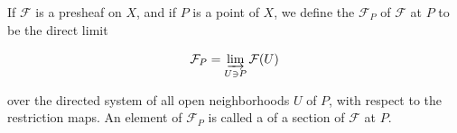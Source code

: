 If $\mathcal{F}$ is a presheaf on $X$, and if $P$ is a point of $X$, we define the  $\mathcal{F}_P$ of $\mathcal{F}$ at $P$ to be the direct limit

$$\mathcal{F}_P = \varinjlim_{U \ni P} \mathcal{F}(U)$$

over the directed system of all open neighborhoods $U$ of $P$, with respect to the restriction maps. An element of $\mathcal{F}_P$ is called a  of a section of $\mathcal{F}$ at $P$.
